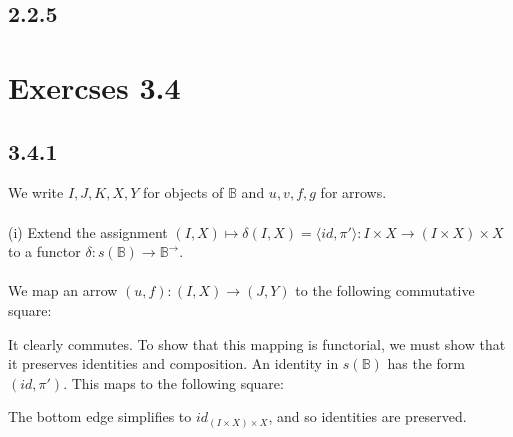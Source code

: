 \documentclass{article}
\begin{document}
\subsection*{2.2.5}


\section*{Exercses 3.4}

\subsection*{3.4.1}

We write $I,J,K,X,Y$ for objects of $\mathbb B$ and $u,v,f,g$ for arrows.\\~\\
(i) Extend the assignment $(I,X) \mapsto \delta(I,X) = \langle id, \pi' \rangle : I \times X \to (I \times X) \times X$
to a functor $\delta : s(\mathbb B) \to \mathbb B^{\to}$.\\~\\
We map an arrow $(u,f) : (I,X) \to (J,Y)$ to the following commutative square:
\begin{center}
\end{center}
It clearly commutes. To show that this mapping is functorial, we must show that it preserves identities and composition.
An identity in $s(\mathbb B)$ has the form $(id, \pi')$. This maps to the following square:
\begin{center}
\end{center}
The bottom edge simplifies to $id_{(I \times X) \times X}$, and so identities are preserved.
\end{document}
